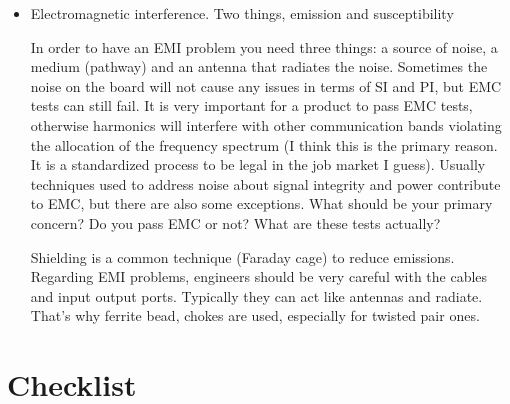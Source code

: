 \documentclass[12pt]{article}
\begin{document}
\begin{itemize}
	\item Electromagnetic interference. Two things, emission and susceptibility
	
In order to have an EMI problem you need three things: a source of noise, a medium (pathway) and an antenna that radiates the noise. Sometimes the noise on the board will not cause any issues in terms of SI and PI, but EMC tests can still fail. It is very important for a product to pass EMC tests, otherwise harmonics will interfere with other communication bands violating the allocation of the frequency spectrum (I think this is the primary reason. It is a standardized process to be legal in the job market I guess). Usually techniques used to address noise about signal integrity and power contribute to EMC, but there are also some exceptions. What should be your primary concern? Do you pass EMC or not? What are these tests actually?

Shielding is a common technique (Faraday cage) to reduce emissions. Regarding EMI problems, engineers should be very careful with the cables and input output ports. Typically they can act like antennas and radiate. That's why ferrite bead, chokes are used, especially for twisted pair ones. 
	
\end{itemize}


\section{Checklist}
\end{document}
